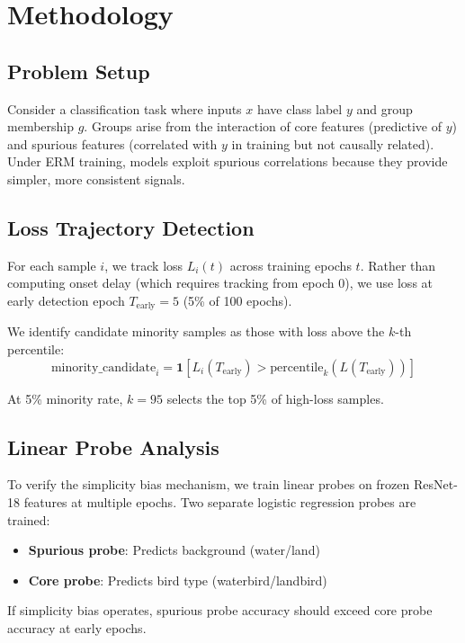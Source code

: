 \section{Methodology}

\subsection{Problem Setup}

Consider a classification task where inputs $x$ have class label $y$ and group membership $g$. Groups arise from the interaction of core features (predictive of $y$) and spurious features (correlated with $y$ in training but not causally related). Under ERM training, models exploit spurious correlations because they provide simpler, more consistent signals.

\subsection{Loss Trajectory Detection}

For each sample $i$, we track loss $L_i(t)$ across training epochs $t$. Rather than computing onset delay (which requires tracking from epoch 0), we use loss at early detection epoch $T_{\text{early}} = 5$ (5\% of 100 epochs).

We identify candidate minority samples as those with loss above the $k$-th percentile:
\begin{equation}
\text{minority\_candidate}_i = \mathbf{1}[L_i(T_{\text{early}}) > \text{percentile}_k(L(T_{\text{early}}))]
\end{equation}

At 5\% minority rate, $k = 95$ selects the top 5\% of high-loss samples.

\subsection{Linear Probe Analysis}

To verify the simplicity bias mechanism, we train linear probes on frozen ResNet-18 features at multiple epochs. Two separate logistic regression probes are trained:
\begin{itemize}
    \item \textbf{Spurious probe}: Predicts background (water/land)
    \item \textbf{Core probe}: Predicts bird type (waterbird/landbird)
\end{itemize}

If simplicity bias operates, spurious probe accuracy should exceed core probe accuracy at early epochs.

